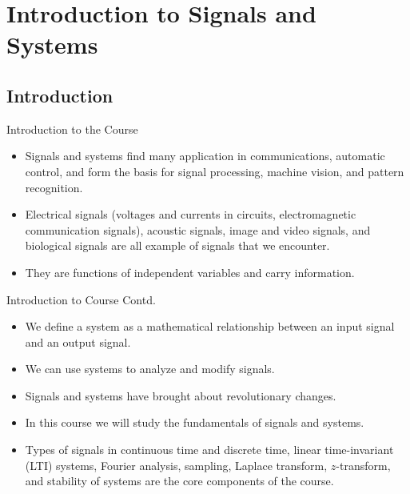 \section{Introduction to Signals and Systems}

\subsection{Introduction}

\begin{frame}{Introduction to the Course}
    \begin{itemize}[<+->]
        \item Signals and systems find many application in communications, automatic control, and form the basis for signal processing, machine vision, and pattern recognition.
        \item Electrical signals (voltages and currents in circuits, electromagnetic communication signals), acoustic signals, image and video signals, and biological signals are all example of signals that we encounter.
        \item They are functions of independent variables and carry information.
    \end{itemize}
\end{frame}

\begin{frame}{Introduction to Course Contd.}
    \begin{itemize}[<+->]
        \item We define a system as a mathematical relationship between an input signal and an output signal.
        \item We can use systems to analyze and modify signals.
        \item Signals and systems have brought about revolutionary changes.
        \item In this course we will study the fundamentals of signals and systems.
        \item Types of signals in continuous time and discrete time, linear time-invariant (LTI) systems, Fourier analysis, sampling, Laplace transform, $z$-transform, and stability of systems are the core components of the course.
    \end{itemize}
\end{frame}




